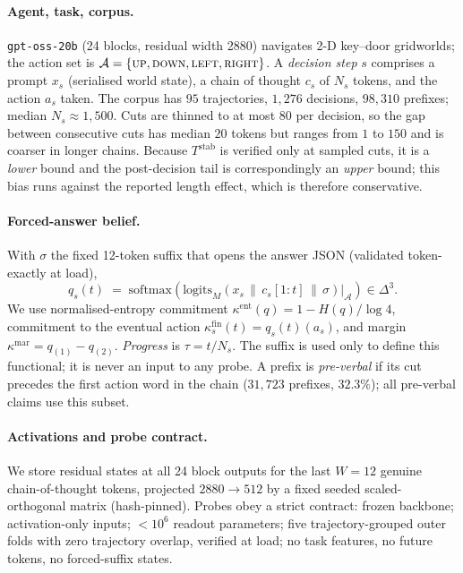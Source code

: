 \documentclass{article}
\newcommand{\qvec}{q}
\newcommand{\kent}{\kappa^{\mathrm{ent}}}
\newcommand{\kfin}{\kappa^{\mathrm{fin}}}
\newcommand{\kmar}{\kappa^{\mathrm{mar}}}
\newcommand{\Tstab}{T^{\mathrm{stab}}}
\begin{document}
\paragraph{Agent, task, corpus.} \texttt{gpt-oss-20b} (24 blocks, residual width 2880)
navigates 2-D key--door gridworlds; the action set is
$\mathcal{A}=\{\textsc{up},\textsc{down},\textsc{left},\textsc{right}\}$. A \emph{decision
step} $s$ comprises a prompt $x_s$ (serialised world state), a chain of thought $c_s$ of
$N_s$ tokens, and the action $a_s$ taken. The corpus has $95$ trajectories, $1{,}276$
decisions, $98{,}310$ prefixes; median $N_s \approx 1{,}500$. Cuts are thinned to at most $80$ per decision, so the gap
between consecutive cuts has median $20$ tokens but ranges from $1$ to $150$ and is coarser
in longer chains. Because $\Tstab$ is verified only at sampled cuts, it is a \emph{lower}
bound and the post-decision tail is correspondingly an \emph{upper} bound; this bias runs
against the reported length effect, which is therefore conservative.

\paragraph{Forced-answer belief.} With $\sigma$ the fixed 12-token suffix that opens the
answer JSON (validated token-exactly at load),
\begin{equation}
\qvec_s(t) \;=\; \mathrm{softmax}\!\left(\mathrm{logits}_M\!\left(x_s \,\|\, c_s[1{:}t] \,\|\, \sigma\right)\big|_{\mathcal{A}}\right) \in \Delta^3 .
\end{equation}
We use normalised-entropy commitment $\kent(q) = 1 - H(q)/\log 4$, commitment to the
eventual action $\kfin_s(t) = \qvec_s(t)(a_s)$, and margin $\kmar = q_{(1)}-q_{(2)}$.
\emph{Progress} is $\tau = t/N_s$. The suffix is used only to define this functional; it is
never an input to any probe. A prefix is \emph{pre-verbal} if its cut precedes the first
action word in the chain ($31{,}723$ prefixes, $32.3\%$); all pre-verbal claims use this
subset.

\paragraph{Activations and probe contract.} We store residual states at all 24 block
outputs for the last $W{=}12$ genuine chain-of-thought tokens, projected $2880\to512$ by a
fixed seeded scaled-orthogonal matrix (hash-pinned). Probes obey a strict contract: frozen
backbone; activation-only inputs; $<\!10^6$ readout parameters; five trajectory-grouped
outer folds with zero trajectory overlap, verified at load; no task features, no future
tokens, no forced-suffix states.
\end{document}
